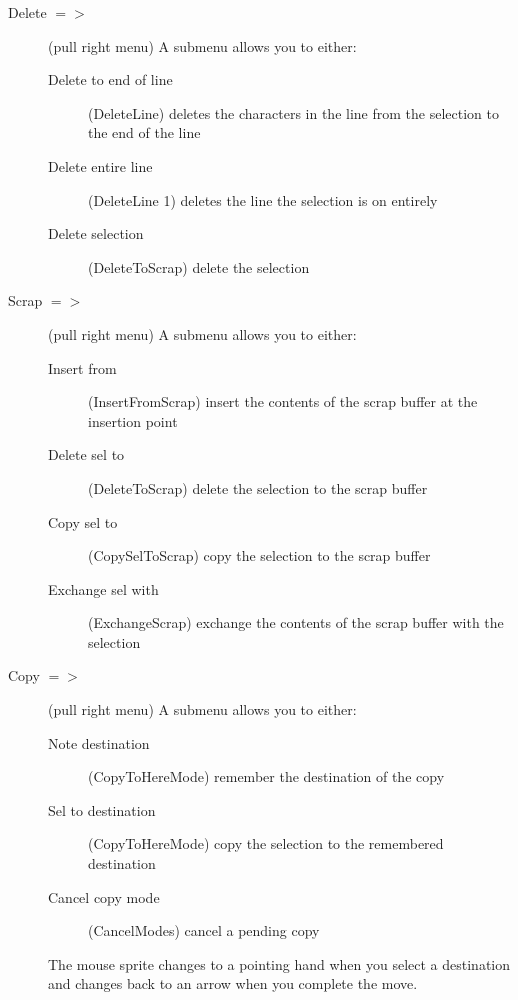 \begin{description}
\begin{description}
	\item[Delete $=>$] (pull right menu)
	A submenu allows you to either:
	\begin{description}

		\item[Delete to end of line] (DeleteLine) deletes the
			characters in the line from the selection to
			the end of the line

		\item[Delete entire line] (DeleteLine 1) deletes the
			line the selection is on entirely 

		\item[Delete selection] (DeleteToScrap) delete the
			selection

	\end{description}

	\item[Scrap $=>$] (pull right menu)
	A submenu allows you to either:
	\begin{description}

		\item[Insert from] (InsertFromScrap) insert the contents
			of the scrap buffer at the insertion point

		\item[Delete sel to] (DeleteToScrap) delete the selection
			to the scrap buffer

		\item[Copy sel to] (CopySelToScrap) copy the selection to
			the scrap buffer

		\item[Exchange sel with] (ExchangeScrap) exchange the
			contents of the scrap buffer with the selection

	\end{description}

	\item[Copy $=>$] (pull right menu)
	A submenu allows you to either:
	\begin{description}

		\item[Note destination] (CopyToHereMode) remember the
			destination of the copy

		\item[Sel to destination] (CopyToHereMode) copy the
			selection to the remembered destination

		\item[Cancel copy mode] (CancelModes) cancel a pending copy

	\end{description}
	The mouse sprite changes to a pointing hand when
	you select a destination and changes back to an arrow
	when you complete the move.


\end{description}
\end{description}
